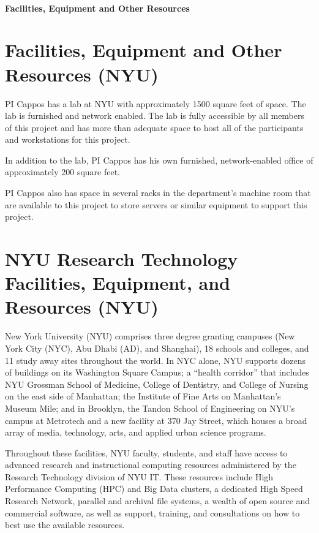 \begin{center}
    {\large \bf \TITLE } \\
    {\bf Facilities, Equipment and Other Resources}
\end{center}

\section*{\centering Facilities, Equipment and Other Resources (NYU)}

PI Cappos has a lab at NYU with approximately 1500 square feet
of space.   The lab is furnished and network enabled.   The lab is fully
accessible by all members of this project and has more than adequate space
to host all of the participants and workstations for this project.

In addition to the lab, PI Cappos has his own furnished, network-enabled office
of approximately 200 square feet.

PI Cappos also has space in several racks in the department's
machine room that are available to this project to store servers or similar
equipment to support this project.


\section*{\centering NYU Research Technology Facilities, Equipment, and Resources (NYU)}

New York University (NYU) comprises three degree granting campuses (New York City (NYC), Abu Dhabi (AD), and Shanghai), 18 schools and colleges, and 11 study away sites throughout the world. In NYC alone, NYU supports dozens of buildings on its Washington Square Campus; a “health corridor” that includes NYU Grossman School of Medicine, College of Dentistry, and College of Nursing on the east side of Manhattan; the Institute of Fine Arts on Manhattan’s Museum Mile; and in Brooklyn, the Tandon School of Engineering on NYU’s campus at Metrotech and a new facility at 370 Jay Street, which houses a broad array of media, technology, arts, and applied urban science programs.

Throughout these facilities, NYU faculty, students, and staff have access to advanced research and instructional computing resources administered by the Research Technology division of NYU IT. These resources include High Performance Computing (HPC) and Big Data clusters, a dedicated High Speed Research Network, parallel and archival file systems, a wealth of open source and commercial software, as well as support, training, and consultations on how to best use the available resources.



